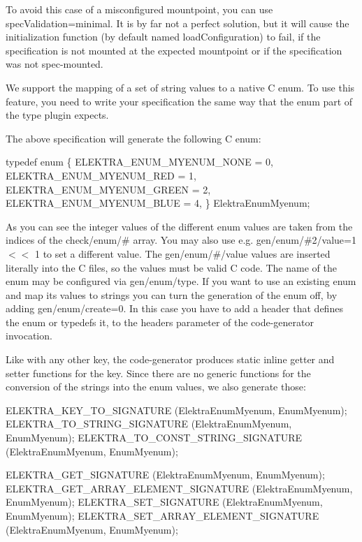 To avoid this case of a misconfigured mountpoint, you can use {\ttfamily spec\+Validation=minimal}. It is by far not a perfect solution, but it will cause the initialization function (by default named {\ttfamily load\+Configuration}) to fail, if the specification is not mounted at the expected mountpoint or if the specification was not {\ttfamily spec-\/mount}ed.

We support the mapping of a set of string values to a native C {\ttfamily enum}. To use this feature, you need to write your specification the same way that the enum part of the {\ttfamily type} plugin expects.




The above specification will generate the following C {\ttfamily enum}\+:


\begin{DoxyCode}
\textcolor{keyword}{typedef} \textcolor{keyword}{enum}
\{
    ELEKTRA\_ENUM\_MYENUM\_NONE = 0,
    ELEKTRA\_ENUM\_MYENUM\_RED = 1,
    ELEKTRA\_ENUM\_MYENUM\_GREEN = 2,
    ELEKTRA\_ENUM\_MYENUM\_BLUE = 4,
\} ElektraEnumMyenum;
\end{DoxyCode}


As you can see the integer values of the different enum values are taken from the indices of the {\ttfamily check/enum/\#} array. You may also use e.\+g. {\ttfamily gen/enum/\#2/value=1 $<$$<$ 1} to set a different value. The {\ttfamily gen/enum/\#/value} values are inserted literally into the C files, so the values must be valid C code. The name of the enum may be configured via {\ttfamily gen/enum/type}. If you want to use an existing {\ttfamily enum} and map its values to strings you can turn the generation of the enum off, by adding {\ttfamily gen/enum/create=0}. In this case you have to add a header that defines the {\ttfamily enum} or {\ttfamily typedef}s it, to the {\ttfamily headers} parameter of the code-\/generator invocation.

Like with any other key, the code-\/generator produces {\ttfamily static inline} getter and setter functions for the key. Since there are no generic functions for the conversion of the strings into the enum values, we also generate those\+:


\begin{DoxyCode}
ELEKTRA\_KEY\_TO\_SIGNATURE (ElektraEnumMyenum, EnumMyenum);
ELEKTRA\_TO\_STRING\_SIGNATURE (ElektraEnumMyenum, EnumMyenum);
ELEKTRA\_TO\_CONST\_STRING\_SIGNATURE (ElektraEnumMyenum, EnumMyenum);

ELEKTRA\_GET\_SIGNATURE (ElektraEnumMyenum, EnumMyenum);
ELEKTRA\_GET\_ARRAY\_ELEMENT\_SIGNATURE (ElektraEnumMyenum, EnumMyenum);
ELEKTRA\_SET\_SIGNATURE (ElektraEnumMyenum, EnumMyenum);
ELEKTRA\_SET\_ARRAY\_ELEMENT\_SIGNATURE (ElektraEnumMyenum, EnumMyenum);
\end{DoxyCode}



